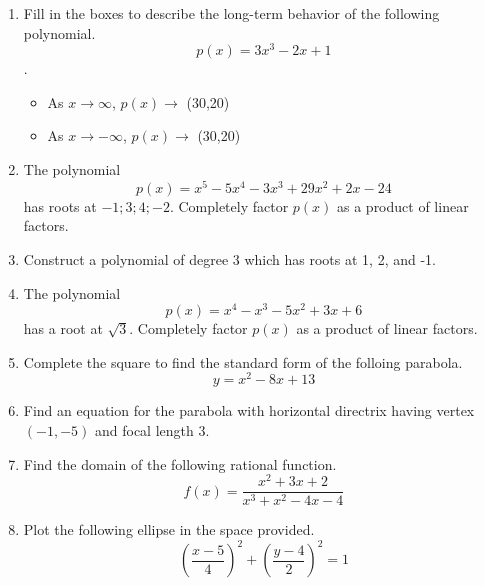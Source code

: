 \documentclass{article}
\begin{document}
\TestTitle[class={College Algebra}, name={Test 3}, term={Spring}, date={Oct. 19}, year={2015}, form={A}]

\AlgebraFacts[geom={show}]

\begin{enumerate}
\item Fill in the boxes to describe the long-term behavior of the following polynomial. \[ p(x) = 3x^3 - 2x + 1 \].

\begin{itemize}
\item As $x \rightarrow \infty$, $p(x) \rightarrow$ \framebox(30,20){} \vspace{0.5cm}
\item As $x \rightarrow -\infty$, $p(x) \rightarrow$ \framebox(30,20){}
\end{itemize} \vspace{1cm}

\item The polynomial \[ p(x) = x^5 - 5x^4 - 3x^3 + 29x^2 + 2x - 24 \] has roots at ${-1;3;4;-2}$. Completely factor $p(x)$ as a product of linear factors. \vspace{6cm}

\item Construct a polynomial of degree 3 which has roots at 1, 2, and -1. \vspace{5cm}

\newpage

\item The polynomial \[ p(x) = x^4 - x^3 - 5x^2 + 3x + 6 \] has a root at $\sqrt{3}$. Completely factor $p(x)$ as a product of linear factors. \vspace{9cm}

\item Complete the square to find the standard form of the folloing parabola. \[ y = x^2 - 8x + 13 \] \vspace{6cm}

\item Find an equation for the parabola with horizontal directrix having vertex $(-1, -5)$ and focal length 3. \vspace{2cm}

\newpage

\item Find the domain of the following rational function. \[ f(x) = \frac{x^2 + 3x + 2}{x^3 + x^2 - 4x - 4} \] \vspace{5cm}

\item Plot the following ellipse in the space provided. \[ \left(\frac{x - 5}{4}\right)^2 + \left(\frac{y - 4}{2}\right)^2 = 1 \]


\end{enumerate}
\end{document}
